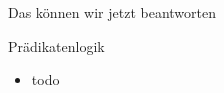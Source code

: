 \begin{frame}[fragile]{Das können wir jetzt beantworten}
	\begin{alertblock}{Prädikatenlogik}
		\begin{itemize}
			\item todo
		\end{itemize}
	\end{alertblock}
\end{frame}